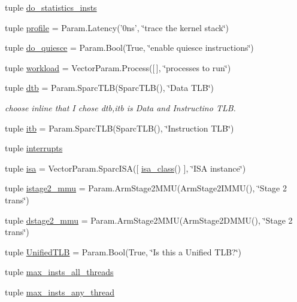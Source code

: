 \begin{DoxyCompactItemize}
tuple \hyperlink{classBaseCPU_a110e001546710f99adde87d1746e9c49}{do\_\-statistics\_\-insts}
\item 
tuple \hyperlink{classBaseCPU_a02161747f06d401b8553ce7a53854005}{profile} = Param.Latency('0ns', \char`\"{}trace the kernel stack\char`\"{})
\item 
tuple \hyperlink{classBaseCPU_aa517e445b968db5f6e09649460450220}{do\_\-quiesce} = Param.Bool(True, \char`\"{}enable quiesce instructions\char`\"{})
\item 
tuple \hyperlink{classBaseCPU_a73d872f4e6fdf59531004dac33e2cd93}{workload} = VectorParam.Process(\mbox{[}$\,$\mbox{]}, \char`\"{}processes to run\char`\"{})
\item 
tuple \hyperlink{classBaseCPU_a6be3ef152e982fb57e224c4a32a431b7}{dtb} = Param.SparcTLB(SparcTLB(), \char`\"{}Data TLB\char`\"{})
\begin{DoxyCompactList}\small\item\em choose inline that I chose dtb,itb is Data and Instructino TLB. \item\end{DoxyCompactList}\item 
tuple \hyperlink{classBaseCPU_a05093b507c1f741f2150103b12ac7056}{itb} = Param.SparcTLB(SparcTLB(), \char`\"{}Instruction TLB\char`\"{})
\item 
tuple \hyperlink{classBaseCPU_abb9c3a7eae9af33c74d2c7da98a171bd}{interrupts}
\item 
tuple \hyperlink{classBaseCPU_a6d1804c8bb7cb5ff7f700541100052c4}{isa} = VectorParam.SparcISA(\mbox{[} \hyperlink{classBaseCPU_a7834205597f6fdfa3801594ba899afcb}{isa\_\-class}() \mbox{]}, \char`\"{}ISA instance\char`\"{})
\item 
tuple \hyperlink{classBaseCPU_a3efa5b96277fd1a9947fc495f93d81aa}{istage2\_\-mmu} = Param.ArmStage2MMU(ArmStage2IMMU(), \char`\"{}Stage 2 trans\char`\"{})
\item 
tuple \hyperlink{classBaseCPU_a75d388d574fc0e0122be1d7167cba0d3}{dstage2\_\-mmu} = Param.ArmStage2MMU(ArmStage2DMMU(), \char`\"{}Stage 2 trans\char`\"{})
\item 
tuple \hyperlink{classBaseCPU_a2d5c6392dac36249566c6dd1ab1629cd}{UnifiedTLB} = Param.Bool(True, \char`\"{}Is this a Unified TLB?\char`\"{})
\item 
tuple \hyperlink{classBaseCPU_a5baeef1affeb41d3e04f0d3450d48f0c}{max\_\-insts\_\-all\_\-threads}
\item 
tuple \hyperlink{classBaseCPU_afa4e8faf201b5d5e4da394405ee84805}{max\_\-insts\_\-any\_\-thread}
\item 

\end{DoxyCompactItemize}
